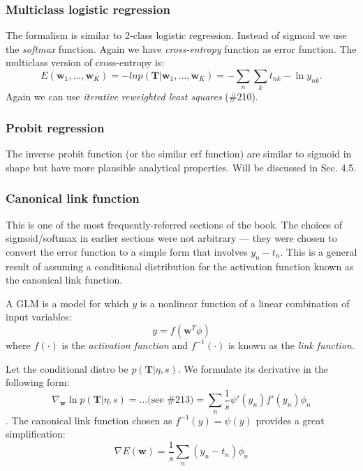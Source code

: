 \documentclass[a4paper]{article}
\newcommand{\mb}{\mathbf}
\newcommand{\lnote}[1]{#1\reversemarginpar\marginpar{{\textit{#1}}}}
\begin{document}
\subsubsection{Multiclass logistic regression}
The formalism is similar to 2-class logistic regression. Instead of sigmoid we use the \textit{softmax} function. Again we have \textit{cross-entropy} function as error function. The multiclass version of cross-entropy is:
\begin{equation}
E(\mb{w}_1,\hdots, \mb{w}_K) = -ln p(\mb{T}| \mb{w}_1, \hdots, \mb{w}_K) = -\sum\limits_n\sum\limits_k t_{nk}-\ln y_{nk}.
\end{equation}
Again we can use \textit{iterative reweighted least squares} (\#210).

\subsubsection{Probit regression}
The inverse probit function (or the similar $\text{erf}$ function) are similar to sigmoid in shape but have more plausible analytical properties. Will be discussed in Sec. 4.5.

\subsubsection{Canonical link function}
This is one of the most frequently-referred sections of the book. The choices of sigmoid/softmax in earlier sections were not arbitrary \---- they were chosen to convert the error function to a simple form that involves $y_n-t_n$. This is a general result of assuming a conditional distribution for the activation function known as the \lnote{canonical link function}.

A GLM is a model for which $y$ is a nonlinear function of a linear combination of input variables: 
\begin{equation}
y=f(\mb{w}^T\phi)
\end{equation}
%
where $f(\cdot)$ is the \textit{activation function} and $f^{-1}(\cdot)$ is known as the \textit{link function}.

Let the conditional distro be $p(\mb{T}|\eta, s)$. We formulate its derivative in the following form:
%
\begin{equation}
\nabla_{\mb{w}} \ln p(\mb{T}|\eta,s)= \hdots \text{(see \#213)} = \sum\limits_n\frac{1}{s}\psi'(y_n)f'(y_n)\phi_n
\end{equation}.
The canonical link function chosen as $f^{-1}(y)=\psi(y)$ provides a great simplification:
\begin{equation}
\nabla E(\mb{w})= \frac{1}{s}\sum\limits_n(y_n-t_n)\phi_n
\end{equation}
\end{document}
